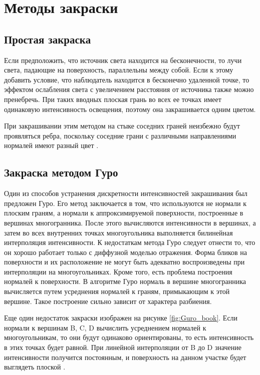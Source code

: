 \clearpage
\section{Методы закраски}
\subsection{Простая закраска}
Если предположить, что источник света находится на бесконечности, то лучи света, падающие на поверхность, параллельны между собой. Если к этому добавить условие, что наблюдатель находится в бесконечно удаленной точке, то эффектом ослабления света с увеличением расстояния от источника также можно пренебречь. При таких вводных плоская грань во всех ее точках имеет одинаковую интенсивность освещения, поэтому она закрашивается одним цветом.

При закрашивании этим методом на стыке соседних граней неизбежно будут проявляться ребра, поскольку соседние грани с различными направлениями нормалей имеют разный цвет \cite{lit5}.

\subsection{Закраска методом Гуро}
Один из способов устранения дискретности интенсивностей закрашивания был предложен Гуро. Его метод заключается в том, что используются не нормали к плоским граням, а нормали к аппроксимируемой поверхности, построенные в вершинах многогранника. После этого вычисляются интенсивности в вершинах, а затем во всех внутренних точках многоугольника выполняется билинейная интерполяция интенсивности.
К недостаткам метода Гуро следует отнести то, что он хорошо работает только с диффузной моделью отражения. Форма бликов на поверхности и их расположение не могут быть адекватно воспроизведены при интерполяции на многоугольниках. Кроме того, есть проблема построения нормалей к поверхности. В алгоритме Гуро нормаль в вершине многогранника вычисляется путем усреднения нормалей к граням, примыкающим к этой вершине. Такое построение сильно зависит от характера разбиения. 

Еще один недостаток закраски изображен на рисунке \ref{fig:Guro_book}. Если нормали к вершинам B, C, D вычислить усреднением нормалей к многоугольникам, то они будут одинаково ориентированы, то есть интенсивность в этих точках будет равной. При линейной интерполяции от B до D значение интенсивности получится постоянным, и поверхность на данном участке будет выглядеть плоской \cite{lit5}.

